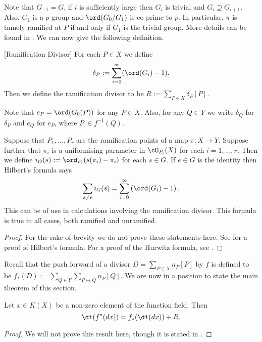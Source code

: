 Note that $G_{-1}=G$, if $i$ is sufficiently large then $G_i$ is trivial and $G_i\supseteq G_{i+1}$.
Also, $G_1$ is a $p$-group and $\ord(G_0/G_1)$ is co-prime to $p$.
In particular, $\pi$ is tamely ramified at $P$ if and only if $G_1$ is the trivial group.
More details can be found in \cite[Ch. IV]{localfields}.
We can now give the following definition.\\

\begin{defn}\label{ramdiv}[Ramification Divisor]
	For each $P\in X$ we define 
	\[
	\delta_P:=\sum_{i=0}^{\infty}(\ord(G_i)-1).
	\]
	Then we define the ramification divisor to be $R:=\sum_{P\in X}\delta_P[P]$.
\end{defn}

Note that $e_P = \ord (G_0(P))$ for any $P \in X$.
Also, for any $Q \in Y$ we write $\delta_Q$ for $\delta_P$ and $e_Q$ for $e_P$, where $P\ \in f^{-1}(Q)$.\\

\begin{thm}
	Suppose that $P_1,\ldots ,P_r$ are the ramification points of a map $\pi:X\rightarrow Y$.
	Suppose further that $\pi_i$ is a uniformising parameter in $\cO_{P_i}(X)$ for each  $i=1,\ldots ,r$.
	Then we define $i_G(s):=\ord_{P_i}(s(\pi_i)-\pi_i)$ for each $s\in G$.
	If $e\in G$ is the identity then Hilbert's formula says
	\[
	    \sum_{s\neq e}i_G(s)=\sum_{i=0}^{\infty}\left(\ord(G_i)-1\right).
	\]
	This can be of use in calculations involving the ramification divisor.
	This formula is true in all cases, both ramified and unramified.
\end{thm}
\begin{proof}
	For the sake of brevity we do not prove these statements here. See \cite[Prop 4, $\S$1, Ch IV]{localfields} for a proof of Hilbert's formula.
	For a proof of the Hurwitz formula, see \citep[Cor 2.4, Ch IV]{hart}.
\end{proof}



Recall that the push forward of a divisor $D = \sum_{P\in X}n_P[P]$ by $f$ is defined to be $f_*(D):= \sum_{Q\in Y} \sum_{P\mapsto Q} n_P [Q]$.
We are now in a position to state the main theorem of this section.\\

\begin{thm}\label{detailedhur}
Let $x\in K(X)$ be a non-zero element of the function field. 
Then 
\[
\di (f^* (dx)) = f_*(\di (dx)) + R.
\] 
\end{thm}
\begin{proof}
We will not prove this result here, though it is stated in \cite[Thm III.4.6]{stichtenoth}.
\end{proof}

